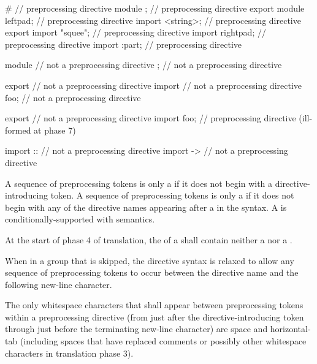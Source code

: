 \documentclass{wg21}
\begin{document}
\begin{example}
    \begin{codeblock}
        #                       // preprocessing directive
        module ;                // preprocessing directive
        export module leftpad;  // preprocessing directive
        import <string>;        // preprocessing directive
        export import "squee";  // preprocessing directive
        import rightpad;        // preprocessing directive
        import :part;           // preprocessing directive

        module                  // not a preprocessing directive
        ;                       // not a preprocessing directive

        export                  // not a preprocessing directive
        import                  // not a preprocessing directive
        foo;                    // not a preprocessing directive

        export                  // not a preprocessing directive
        import foo;             // preprocessing directive (ill-formed at phase 7)

        import ::               // not a preprocessing directive
        import ->               // not a preprocessing directive
    \end{codeblock}
\end{example}

\pnum
A sequence of preprocessing tokens is only a 
if it does not begin with a directive-introducing token.
A sequence of preprocessing tokens is only a 
if it does not begin with any of the directive names
appearing after a \tcode{\#} in the syntax.
A  is
conditionally-supported with
semantics.

\pnum
At the start of phase 4 of translation,
the  of a  shall
contain neither a  nor a .

\pnum
When in a group that is skipped, the directive
syntax is relaxed to allow any sequence of preprocessing tokens to occur between
the directive name and the following new-line character.

\pnum
The only whitespace characters that shall appear
between preprocessing tokens
within a preprocessing directive
(from just after the directive-introducing token
through just before the terminating new-line character)
are space and horizontal-tab
(including spaces that have replaced comments
or possibly other whitespace characters
in translation phase 3).
\end{document}
